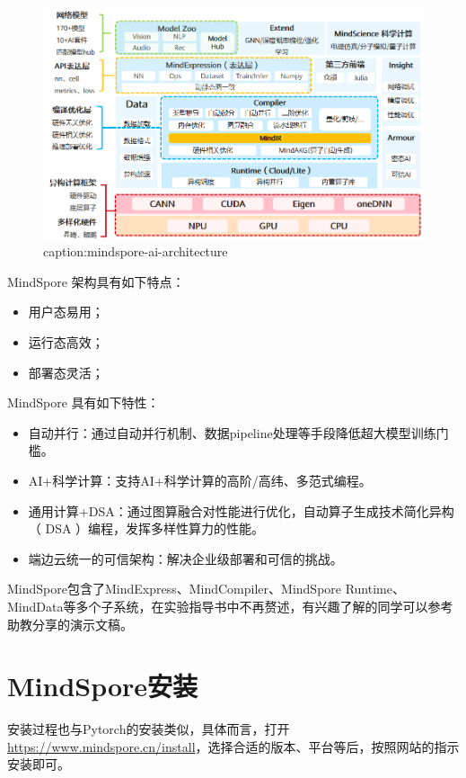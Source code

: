 \begin{figure}[htbp]
	\centering
	\includegraphics[width=1\textwidth]{figures/mindspore-ai-architecture.png}
	\caption{caption:mindspore-ai-architecture}
	\label{fig:mindspore-ai-architecture}
\end{figure}


MindSpore 架构具有如下特点：
\begin{itemize}
    \item 用户态易用；
    \item 运行态高效；
    \item 部署态灵活；
\end{itemize}

MindSpore 具有如下特性：
\begin{itemize}
    \item 自动并行：通过自动并行机制、数据pipeline处理等手段降低超大模型训练门槛。
    \item AI+科学计算：支持AI+科学计算的高阶/高纬、多范式编程。
    \item 通用计算+DSA：通过图算融合对性能进行优化，自动算子生成技术简化异构（ DSA ）编程，发挥多样性算力的性能。
    \item 端边云统一的可信架构：解决企业级部署和可信的挑战。
\end{itemize}


MindSpore包含了MindExpress、MindCompiler、MindSpore Runtime、MindData等多个子系统，在实验指导书中不再赘述，有兴趣了解的同学可以参考助教分享的演示文稿。


\section{MindSpore安装}

安装过程也与Pytorch的安装类似，具体而言，打开\url{https://www.mindspore.cn/install}，选择合适的版本、平台等后，按照网站的指示安装即可。

